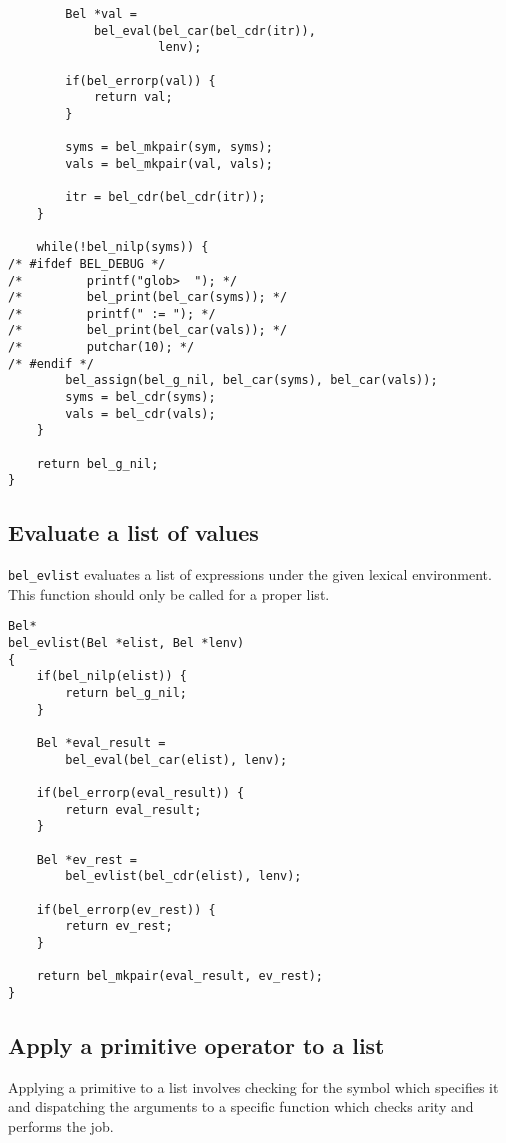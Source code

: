 \documentclass[openright,a4paper,twoside,12pt]{memoir}
\begin{document}
\begin{enumerate}
\begin{verbatim}
        Bel *val =
            bel_eval(bel_car(bel_cdr(itr)),
                     lenv);

        if(bel_errorp(val)) {
            return val;
        }
        
        syms = bel_mkpair(sym, syms);
        vals = bel_mkpair(val, vals);
        
        itr = bel_cdr(bel_cdr(itr));
    }

    while(!bel_nilp(syms)) {
/* #ifdef BEL_DEBUG */
/*         printf("glob>  "); */
/*         bel_print(bel_car(syms)); */
/*         printf(" := "); */
/*         bel_print(bel_car(vals)); */
/*         putchar(10); */
/* #endif */
        bel_assign(bel_g_nil, bel_car(syms), bel_car(vals));
        syms = bel_cdr(syms);
        vals = bel_cdr(vals);
    }

    return bel_g_nil;
}
\end{verbatim}
\end{enumerate}

\subsection{Evaluate a list of values}
\label{sec:orgad57c94}

\texttt{bel\_evlist} evaluates a list of expressions under the given lexical
environment. This function should only be called for a proper list.

\begin{verbatim}
Bel*
bel_evlist(Bel *elist, Bel *lenv)
{
    if(bel_nilp(elist)) {
        return bel_g_nil;
    }

    Bel *eval_result =
        bel_eval(bel_car(elist), lenv);

    if(bel_errorp(eval_result)) {
        return eval_result;
    }

    Bel *ev_rest =
        bel_evlist(bel_cdr(elist), lenv);

    if(bel_errorp(ev_rest)) {
        return ev_rest;
    }

    return bel_mkpair(eval_result, ev_rest);
}
\end{verbatim}

\subsection{Apply a primitive operator to a list}
\label{sec:orgc12e57a}

Applying a primitive to a list involves checking for the symbol which
specifies it and dispatching the arguments to a specific function
which checks arity and performs the job.
\end{document}
